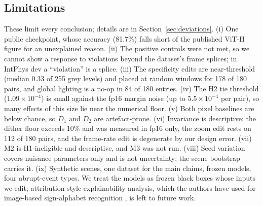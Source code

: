 \subsection{Limitations}
\label{sec:limitations}
These limit every conclusion; details are in Section~\ref{sec:deviations}. (i) One public checkpoint, whose accuracy (81.7\%) falls short of the published ViT-H figure for an unexplained reason. (ii) The positive controls were not met, so we cannot show a response to violations beyond the dataset's frame splices; in IntPhys dev a ``violation'' is a splice. (iii) The specificity edits are near-threshold (median 0.33 of 255 grey levels) and placed at random windows for 178 of 180 pairs, and global lighting is a no-op in 84 of 180 entries. (iv) The H2 tie threshold ($1.09\times10^{-4}$) is small against the fp16 margin noise (up to $5.5\times10^{-4}$ per pair), so many effects of this size lie near the numerical floor. (v) Both pixel baselines are below chance, so $D_1$ and $D_2$ are artefact-prone. (vi) Invariance is descriptive: the dither floor exceeds 10\% and was measured in fp16 only, the zoom edit rests on 112 of 180 pairs, and the frame-rate edit is degenerate by our design error. (vii) M2 is H1-ineligible and descriptive, and M3 was not run. (viii) Seed variation covers nuisance parameters only and is not uncertainty; the scene bootstrap carries it. (ix) Synthetic scenes, one dataset for the main claims, frozen models, four abrupt-event types. We treat the models as frozen black boxes whose inputs we edit; attribution-style explainability analysis, which the authors have used for image-based sign-alphabet recognition \cite{jayaprasad2025}, is left to future work.
